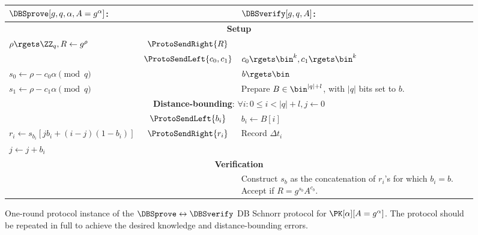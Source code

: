 \begin{figure*}
  \centering
  \begin{tabular}{p{}cp{}}
    \(\DBSprove[g, q, \alpha, A = g^\alpha]\):
    & &
    \(\DBSverify[g, q, A]\):
    \\
    \midrule

    \multicolumn{3}{c}{\textbf{Setup}} \\

    \(\rho\rgets \ZZ_q, R\gets g^{\rho}\)
    & \(\ProtoSendRight{R}\)
    &
    \\

    & \(\ProtoSendLeft{c_0, c_1}\)
    & \(c_0\rgets \bin^k, c_1\rgets \bin^k\)
    \\

    \(s_0\gets \rho - c_0\alpha \pmod q\)
    &
    & \(b\rgets \bin\)
    \\

    \(s_1\gets \rho - c_1\alpha \pmod q\)
    &
    & Prepare \(B\in \bin^{|q|+l}\), with \(|q|\) bits set to \(b\).
    \\

    \midrule
    \multicolumn{3}{c}{\textbf{Distance-bounding}: \(\forall i: 0\leq i < |q| + 
        l, j\gets 0\)} \\


    & \(\ProtoSendLeft{b_i}\)
    & \(b_i\gets B[i]\)
    \\

    \(r_i\gets s_{b_i}[jb_i + (i-j)(1-b_i)]\)
    & \(\ProtoSendRight{r_i}\)
    & Record \(\Delta t_i\)
    \\

    \(j \gets j + b_i\)
    &
    &
    \\

    \midrule
    \multicolumn{3}{c}{\textbf{Verification}}
    \\

    &
    & Construct \(s_b\) as the concatenation of \(r_i\)'s for which \(b_i = 
      b\).
      Accept if \(R = g^{s_b} A^{c_b}\).
    \\
    
  \end{tabular}
  \caption{%
    One-round protocol instance of the \(\DBSprove\leftrightarrow \DBSverify\) \ac{DB} Schnorr protocol for \(\PK[\alpha][A = g^\alpha]\).
    The protocol should be repeated in full to achieve the desired knowledge and distance-bounding errors.
  }%
  \label{SchnorrFigure}
\end{figure*}

